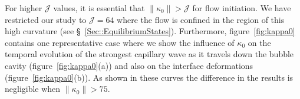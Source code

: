 \documentclass[final]{jfm}
\begin{document}
For higher $\mathcal{J}$ values, it is essential that $\|\kappa_0\| > \mathcal{J}$ for flow initiation. We have restricted our study to $\mathcal{J} = 64$ where the flow is confined in the region of this high curvature (see \S~\ref{Sec::EquilibriumStates}). Furthermore, figure~\ref{fig:kappa0} contains one representative case where we show the influence of $\kappa_0$ on the temporal evolution of the strongest capillary wave as it travels down the bubble cavity (figure~\ref{fig:kappa0}(a)) and also on the interface deformations (figure~\ref{fig:kappa0}(b)). As shown in these curves the difference in the results is negligible when $\|\kappa_0\| > 75$.



\end{document}
